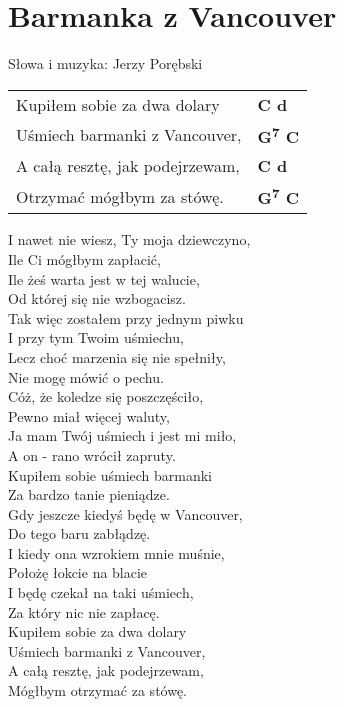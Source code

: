 \section{Barmanka z Vancouver}

Słowa i muzyka: Jerzy Porębski

\vspace{2em}
\begin{tabular}{@{}p{8cm}@{}l@{}}
Kupiłem sobie za dwa dolary & \bfseries C d\\
Uśmiech barmanki z Vancouver, & \bfseries G\textsuperscript{7} C\\
A całą resztę, jak podejrzewam, & \bfseries C d\\
Otrzymać mógłbym za stówę. & \bfseries G\textsuperscript{7} C\\
\end{tabular}

\vspace{1em}
I nawet nie wiesz, Ty moja dziewczyno, \\
Ile Ci mógłbym zapłacić, \\
Ile żeś warta jest w tej walucie, \\
Od której się nie wzbogacisz. \\

Tak więc zostałem przy jednym piwku \\
I przy tym Twoim uśmiechu, \\
Lecz choć marzenia się nie spełniły, \\
Nie mogę mówić o pechu. \\

Cóż, że koledze się poszczęściło, \\
Pewno miał więcej waluty, \\
Ja mam Twój uśmiech i jest mi miło, \\
A on - rano wrócił zapruty. \\

Kupiłem sobie uśmiech barmanki \\
Za bardzo tanie pieniądze. \\
Gdy jeszcze kiedyś będę w Vancouver, \\
Do tego baru zabłądzę. \\

I kiedy ona wzrokiem mnie muśnie, \\
Położę łokcie na blacie \\
I będę czekał na taki uśmiech, \\
Za który nic nie zapłacę. \\

Kupiłem sobie za dwa dolary \\
Uśmiech barmanki z Vancouver, \\
A całą resztę, jak podejrzewam, \\
Mógłbym otrzymać za stówę. \\
